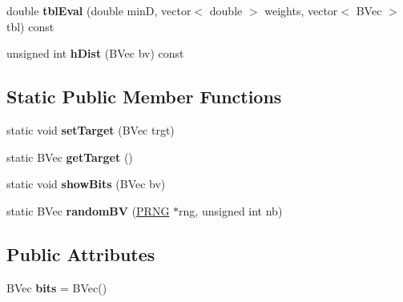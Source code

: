 \begin{DoxyCompactItemize}
\item 
\hypertarget{class_u_demo_1_1_targeted_b_v_a5338a3ce60b8731e18ddb44d452521ca}{double {\bfseries tbl\-Eval} (double min\-D, vector$<$ double $>$ weights, vector$<$ B\-Vec $>$ tbl) const }\label{class_u_demo_1_1_targeted_b_v_a5338a3ce60b8731e18ddb44d452521ca}

\item 
\hypertarget{class_u_demo_1_1_targeted_b_v_adb9956e020b7be112720aac52fb6549b}{unsigned int {\bfseries h\-Dist} (B\-Vec bv) const }\label{class_u_demo_1_1_targeted_b_v_adb9956e020b7be112720aac52fb6549b}

\end{DoxyCompactItemize}
\subsection*{Static Public Member Functions}
\begin{DoxyCompactItemize}
\item 
\hypertarget{class_u_demo_1_1_targeted_b_v_a22e7508fcdba461a70451922a2d9ac7d}{static void {\bfseries set\-Target} (B\-Vec trgt)}\label{class_u_demo_1_1_targeted_b_v_a22e7508fcdba461a70451922a2d9ac7d}

\item 
\hypertarget{class_u_demo_1_1_targeted_b_v_adfeab920c07d1618dc126fda84bff621}{static B\-Vec {\bfseries get\-Target} ()}\label{class_u_demo_1_1_targeted_b_v_adfeab920c07d1618dc126fda84bff621}

\item 
\hypertarget{class_u_demo_1_1_targeted_b_v_a71c0f136d7c4ea5c0946b4a889382f24}{static void {\bfseries show\-Bits} (B\-Vec bv)}\label{class_u_demo_1_1_targeted_b_v_a71c0f136d7c4ea5c0946b4a889382f24}

\item 
\hypertarget{class_u_demo_1_1_targeted_b_v_ac5b5aff9e9eaba6e6e6a42f8f6a6b64e}{static B\-Vec {\bfseries random\-B\-V} (\hyperlink{class_k_base_1_1_p_r_n_g}{P\-R\-N\-G} $\ast$rng, unsigned int nb)}\label{class_u_demo_1_1_targeted_b_v_ac5b5aff9e9eaba6e6e6a42f8f6a6b64e}

\end{DoxyCompactItemize}
\subsection*{Public Attributes}
\begin{DoxyCompactItemize}
\item 
\hypertarget{class_u_demo_1_1_targeted_b_v_a9a179eb46b8e30ea2ddf818c1064ef1c}{B\-Vec {\bfseries bits} = B\-Vec()}\label{class_u_demo_1_1_targeted_b_v_a9a179eb46b8e30ea2ddf818c1064ef1c}

\end{DoxyCompactItemize}
